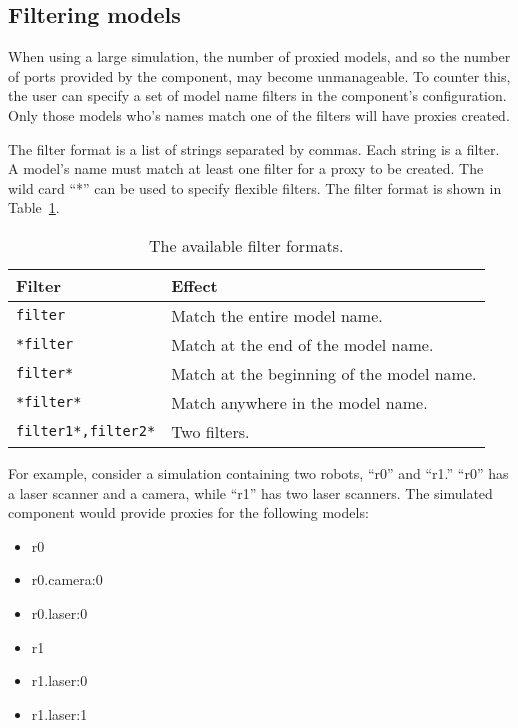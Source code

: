 \documentclass[a4paper,10pt]{article}
\begin{document}
\subsection{Filtering models}
\label{sec1:filtering-models}

When using a large simulation, the number of proxied models, and so the number
of ports provided by the component, may become unmanageable. To counter this,
the user can specify a set of model name filters in the component's
configuration. Only those models who's names match one of the filters will have
proxies created.

The filter format is a list of strings separated by commas. Each string is a
filter. A model's name must match at least one filter for a proxy to be
created. The wild card ``*'' can be used to specify flexible filters. The
filter format is shown in Table~\ref{tab:filters}.

\begin{table}[t]
  \centering
  \begin{tabularx}{0.6\columnwidth}{lX}
    \toprule
    Filter & Effect \\
    \midrule
    \verb|filter| & Match the entire model name. \\
    \verb|*filter| & Match at the end of the model name. \\
    \verb|filter*| & Match at the beginning of the model name. \\
    \verb|*filter*| & Match anywhere in the model name. \\
    \verb|filter1*,filter2*| & Two filters. \\
    \bottomrule
  \end{tabularx}
  \caption{The available filter formats.}
  \label{tab:filters}
\end{table}

For example, consider a simulation containing two robots, ``r0'' and ``r1.''
``r0'' has a laser scanner and a camera, while ``r1'' has two laser scanners.
The simulated component would provide proxies for the following models:

\begin{itemize}
  \item r0
  \item r0.camera:0
  \item r0.laser:0
  \item r1
  \item r1.laser:0
  \item r1.laser:1
\end{itemize}
\end{document}
